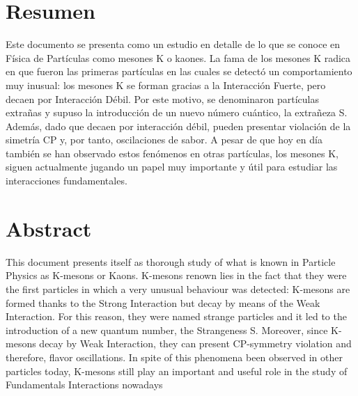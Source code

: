\chapter*{Resumen}
\label{cap:abstract}

Este documento se presenta como un estudio en detalle de lo que se conoce en Física de Partículas como mesones K o kaones. La fama de los mesones K radica en que fueron las primeras partículas en las cuales se detectó un comportamiento muy inusual: los mesones K se forman gracias a la Interacción Fuerte, pero decaen por Interacción Débil. Por este motivo, se denominaron partículas extrañas y supuso la introducción de un nuevo número cuántico, la extrañeza S. Además, dado que decaen por interacción débil, pueden presentar violación de la simetría CP y, por tanto, oscilaciones de sabor. A pesar de que hoy en día también se han observado estos fenómenos en otras partículas, los mesones K, siguen actualmente jugando un papel muy importante y útil para estudiar las interacciones fundamentales. 
\vspace{2cm}

{\let\clearpage\relax\chapter*{Abstract}}
This document presents itself as thorough study of what is known in Particle Physics as K-mesons or Kaons. K-mesons renown lies in the fact that they were the first particles in which a very unusual behaviour was detected: K-mesons are formed thanks to the Strong Interaction but decay by means of the Weak Interaction. For this reason, they were named strange particles and it led to the introduction of a new quantum number, the Strangeness S. Moreover, since K-mesons decay by Weak Interaction, they can present CP-symmetry violation and therefore, flavor oscillations. In spite of this phenomena been observed  in other particles today, K-mesons still play an important and useful role in the study of Fundamentals Interactions nowadays